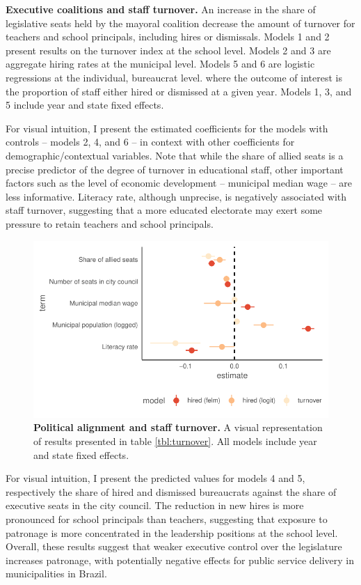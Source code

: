 \documentclass[12pt,a4paper]{article}
\begin{document}
\begin{landscape}
    \begin{table}[t]
      \centering
      \footnotesize
      
      \caption{{\bf Executive coalitions and staff turnover.} An increase in the share of legislative seats held by the mayoral coalition decrease the amount of turnover for teachers and school principals, including hires or dismissals. Models 1 and 2 present results on the turnover index at the school level. Models 2 and 3 are aggregate hiring rates at the municipal level. Models 5 and 6 are logistic regressions at the individual, bureaucrat level. where the outcome of interest is the proportion of staff either hired or dismissed at a given year. Models 1, 3, and 5 include year and state fixed effects.}
      \label{tbl:turnover}
    \end{table}
\end{landscape}

For visual intuition, I present the estimated coefficients for the models with controls -- models 2, 4, and 6 -- in context with other coefficients for demographic/contextual variables. Note that while the share of allied seats is a precise predictor of the degree of turnover in educational staff, other important factors such as the level of economic development -- municipal median wage -- are less informative. Literacy rate, although unprecise, is negatively associated with staff turnover, suggesting that a more educated electorate may exert some pressure to retain teachers and school principals. 

\begin{figure}[h]
    \centering
    \includegraphics[width=0.6\linewidth]{plots/plot_coalition_coef_mun.pdf}
    \caption{{\bf Political alignment and staff turnover.} A visual representation of results presented in table \ref{tbl:turnover}. All models include year and state fixed effects.}
    \label{fig:coalition_turnover}
\end{figure}

For visual intuition, I present the predicted values for models 4 and 5, respectively the share of hired and dismissed bureaucrats against the share of executive seats in the city council. The reduction in new hires is more pronounced for school principals than teachers, suggesting that exposure to patronage is more concentrated in the leadership positions at the school level. Overall, these results suggest that weaker executive control over the legislature increases patronage, with potentially negative effects for public service delivery in municipalities in Brazil.
\end{document}
